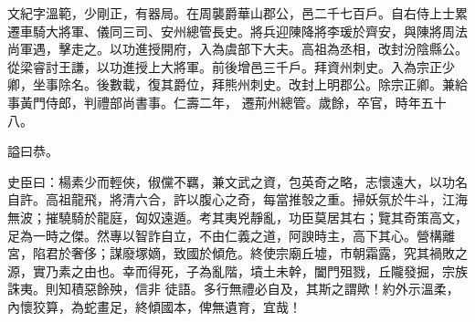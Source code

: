 \begin{pinyinscope}
 文紀字溫範，少剛正，有器局。在周襲爵華山郡公，邑二千七百戶。自右侍上士累遷車騎大將軍、儀同三司、安州總管長史。將兵迎陳降將李瑗於齊安，與陳將周法尚軍遇，擊走之。以功進授開府，入為虞部下大夫。高祖為丞相，改封汾陰縣公。從梁睿討王謙，以功進授上大將軍。前後增邑三千戶。拜資州刺史。入為宗正少卿，坐事除名。後數載，復其爵位，拜熊州刺史。改封上明郡公。除宗正卿。兼給事黃門侍郎，判禮部尚書事。仁壽二年，
 遷荊州總管。歲餘，卒官，時年五十八。



 謚曰恭。



 史臣曰：楊素少而輕俠，俶儻不羈，兼文武之資，包英奇之略，志懷遠大，以功名自許。高祖龍飛，將清六合，許以腹心之奇，每當推彀之重。掃妖氛於牛斗，江海無波；摧驍騎於龍庭，匈奴遠遁。考其夷兇靜亂，功臣莫居其右；覽其奇策高文，足為一時之傑。然專以智詐自立，不由仁義之道，阿諛時主，高下其心。營構離宮，陷君於奢侈；謀廢塚嫡，致國於傾危。終使宗廟丘墟，市朝霜露，究其禍敗之源，實乃素之由也。幸而得死，子為亂階，墳土未幹，闔門殂戮，丘隴發掘，宗族誅夷。則知積惡餘殃，信非
 徒語。多行無禮必自及，其斯之謂歟！約外示溫柔，內懷狡算，為蛇畫足，終傾國本，俾無遺育，宜哉！



\end{pinyinscope}